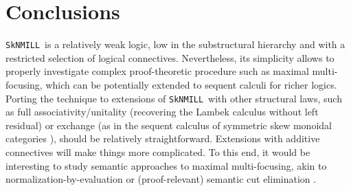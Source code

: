 \documentclass[runningheads]{llncs}
\newcommand{\tr}{\otimes \mathsf{R}}
\newcommand{\lleft}{{\multimap}\mathsf{L}}
\newcommand{\otR}{\tr}
\newcommand{\lolliL}{\lleft}
\newcommand{\ax}{\mathsf{ax}}
\newcommand{\lolli}{\multimap}
\newcommand{\SkNMILL}{\texttt{SkNMILL}}
\newcommand{\up}{\Uparrow}
\newcommand{\focus}{\mathsf{focus}}
\begin{document}



\section{Conclusions}\label{sec:conclusions}

\SkNMILL\ is a relatively weak logic, low in the substructural hierarchy and with a restricted selection of logical connectives. Nevertheless, its simplicity allows to properly investigate complex proof-theoretic procedure such as maximal multi-focusing, which can be potentially extended to sequent calculi for richer logics. Porting the technique to extensions of \SkNMILL\ with other structural laws, such as full associativity/unitality (recovering the Lambek calculus without left residual) or exchange (as in the sequent calculus of symmetric skew monoidal categories \cite{veltri:coherence:2021}), should be relatively straightforward. Extensions with additive connectives will make things more complicated. To this end, it would be interesting to study semantic approaches to maximal multi-focusing, akin to normalization-by-evaluation \cite{ADHS:noretl,NbELambek} or (proof-relevant) semantic cut elimination \cite{Okada99}.
\end{document}
